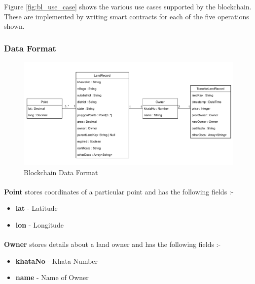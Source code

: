 \documentclass{article}
\begin{document}
        Figure \ref{fig:bl_use_case} shows the various use cases supported by the blockchain. These are implemented by writing smart contracts for each of the five operations shown.

        \subsubsection{Data Format}
            \begin{figure}[htbp]
                \includegraphics[scale=0.25]{blockchain_data_format}
                \centering
                \caption{Blockchain Data Format}
            \end{figure}

        \paragraph{}
        \textbf{Point} stores coordinates of a particular point and has the following fields :-
        \begin{itemize}
            \item \textbf{lat} - Latitude
            \item \textbf{lon} - Longitude
        \end{itemize}

        \paragraph{}
        \textbf{Owner} stores details about a land owner and has the following fields :-
        \begin{itemize}
            \item \textbf{khataNo} - Khata Number
            \item \textbf{name} - Name of Owner
        \end{itemize}
\end{document}
